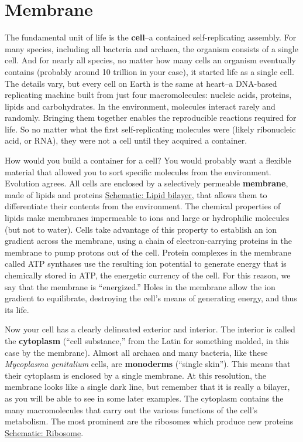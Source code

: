 \documentclass[]{tufte-book}
\begin{document}
\hypertarget{membrane}{%
\section{Membrane}\label{membrane}}

The fundamental unit of life is the \textbf{cell}--a contained self-replicating assembly. For many species, including all bacteria and archaea, the organism consists of a single cell. And for nearly all species, no matter how many cells an organism eventually contains (probably around 10 trillion in your case), it started life as a single cell. The details vary, but every cell on Earth is the same at heart--a DNA-based replicating machine built from just four macromolecules: nucleic acids, proteins, lipids and carbohydrates. In the environment, molecules interact rarely and randomly. Bringing them together enables the reproducible reactions required for life. So no matter what the first self-replicating molecules were (likely ribonucleic acid, or RNA), they were not a cell until they acquired a container.

How would you build a container for a cell? You would probably want a flexible material that allowed you to sort specific molecules from the environment. Evolution agrees. All cells are enclosed by a selectively permeable \textbf{membrane}, made of lipids and proteins \protect\hyperlink{Lipid_bilayer}{Schematic: Lipid bilayer}, that allows them to differentiate their contents from the environment. The chemical properties of lipids make membranes impermeable to ions and large or hydrophilic molecules (but not to water). Cells take advantage of this property to establish an ion gradient across the membrane, using a chain of electron-carrying proteins in the membrane to pump protons out of the cell. Protein complexes in the membrane called ATP synthases use the resulting ion potential to generate energy that is chemically stored in ATP, the energetic currency of the cell. For this reason, we say that the membrane is ``energized.'' Holes in the membrane allow the ion gradient to equilibrate, destroying the cell's means of generating energy, and thus its life.

Now your cell has a clearly delineated exterior and interior. The interior is called the \textbf{cytoplasm} (``cell substance,'' from the Latin for something molded, in this case by the membrane). Almost all archaea and many bacteria, like these \emph{Mycoplasma genitalium} cells, are \textbf{monoderms} (``single skin''). This means that their cytoplasm is enclosed by a single membrane. At this resolution, the membrane looks like a single dark line, but remember that it is really a bilayer, as you will be able to see in some later examples. The cytoplasm contains the many macromolecules that carry out the various functions of the cell's metabolism. The most prominent are the ribosomes which produce new proteins \protect\hyperlink{Ribosome}{Schematic: Ribosome}.
\end{document}
